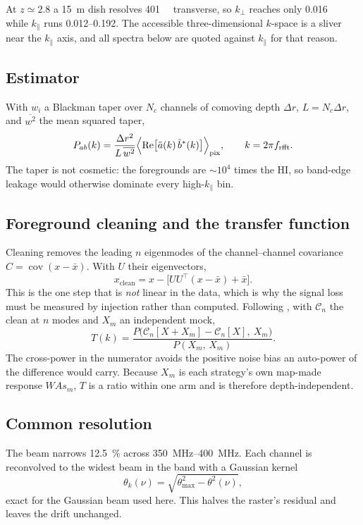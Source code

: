 \documentclass[a4paper,fleqn,usenatbib]{mnras}
\newcommand{\kpar}{k_{\parallel}}
\newcommand{\kperp}{k_{\perp}}
\begin{document}
At $z \simeq 2.8$ a \SI{15}{\metre} dish resolves \SI{401}{\mega\parsec}
transverse, so $\kperp$ reaches only \SI{0.016}{\per\mega\parsec} while $\kpar$
runs \numrange{0.012}{0.192}. The accessible three-dimensional $k$-space is a
sliver near the $\kpar$ axis, and all spectra below are quoted against $\kpar$
for that reason.

\subsection{Estimator}
With $w_i$ a Blackman taper over $N_c$ channels of comoving depth $\Delta r$,
$L = N_c \Delta r$, and $\overline{w^2}$ the mean squared taper,
\begin{equation}
  P_{ab}(k) = \frac{\Delta r^{2}}{L\,\overline{w^{2}}}
    \Bigl\langle \operatorname{Re}\bigl[\tilde a(k)\,\tilde b^{*}(k)\bigr]
    \Bigr\rangle_{\mathrm{pix}},
  \qquad k = 2\pi f_{\mathrm{rfft}} .
  \label{eq:pkpar}
\end{equation}
The taper is not cosmetic: the foregrounds are $\sim10^{4}$ times the HI, so
band-edge leakage would otherwise dominate every high-$\kpar$ bin.

\subsection{Foreground cleaning and the transfer function}
Cleaning removes the leading $n$ eigenmodes of the channel--channel covariance
$C = \operatorname{cov}(x - \bar{x})$. With $U$ their eigenvectors,
\begin{equation}
  x_{\mathrm{clean}} = x - \bigl[ U U^{\top}(x - \bar{x}) + \bar{x} \bigr].
  \label{eq:pca}
\end{equation}
This is the one step that is \emph{not} linear in the data, which is why the
signal loss must be measured by injection rather than computed. Following
\citet{Cunnington2023}, with $\mathcal{C}_n$ the clean at $n$ modes and $X_m$ an
independent mock,
\begin{equation}
  T(k) = \frac{P\bigl(\mathcal{C}_n[X + X_m] - \mathcal{C}_n[X],\ X_m\bigr)}
              {P(X_m,\,X_m)} .
  \label{eq:tf}
\end{equation}
The cross-power in the numerator avoids the positive noise bias an auto-power of
the difference would carry. Because $X_m$ is each strategy's own map-made
response $WAs_m$, $T$ is a ratio within one arm and is therefore
depth-independent.

\subsection{Common resolution}
The beam narrows \SI{12.5}{\percent} across \SIrange{350}{400}{\mega\hertz}.
Each channel is reconvolved to the widest beam in the band with a Gaussian
kernel
\begin{equation}
  \theta_{k}(\nu) = \sqrt{\theta_{\max}^{2} - \theta^{2}(\nu)},
  \label{eq:commonres}
\end{equation}
exact for the Gaussian beam used here. This halves the raster's residual and
leaves the drift unchanged.
\end{document}
